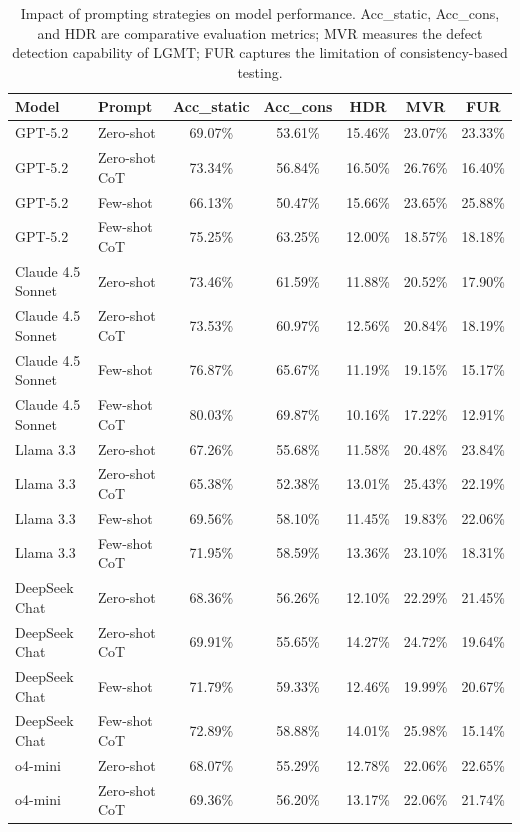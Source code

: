 \begin{table}[pos=htbp]
\centering
\caption{Impact of prompting strategies on model performance. Acc\_static, Acc\_cons, and HDR are comparative evaluation metrics; MVR measures the defect detection capability of LGMT; FUR captures the limitation of consistency-based testing.}\label{tab:rq4}
\begin{tabular}{llccc|c|c}
\toprule
Model & Prompt & Acc\_static & Acc\_cons & HDR & MVR & FUR \\
\midrule
GPT-5.2 & Zero-shot & 69.07\% & 53.61\% & 15.46\% & 23.07\% & 23.33\% \\
GPT-5.2 & Zero-shot CoT & 73.34\% & 56.84\% & 16.50\% & 26.76\% & 16.40\% \\
GPT-5.2 & Few-shot & 66.13\% & 50.47\% & 15.66\% & 23.65\% & 25.88\% \\
GPT-5.2 & Few-shot CoT & 75.25\% & 63.25\% & 12.00\% & 18.57\% & 18.18\% \\
\midrule
Claude 4.5 Sonnet & Zero-shot & 73.46\% & 61.59\% & 11.88\% & 20.52\% & 17.90\% \\
Claude 4.5 Sonnet & Zero-shot CoT & 73.53\% & 60.97\% & 12.56\% & 20.84\% & 18.19\% \\
Claude 4.5 Sonnet & Few-shot & 76.87\% & 65.67\% & 11.19\% & 19.15\% & 15.17\% \\
Claude 4.5 Sonnet & Few-shot CoT & 80.03\% & 69.87\% & 10.16\% & 17.22\% & 12.91\% \\
\midrule
Llama 3.3 & Zero-shot & 67.26\% & 55.68\% & 11.58\% & 20.48\% & 23.84\% \\
Llama 3.3 & Zero-shot CoT & 65.38\% & 52.38\% & 13.01\% & 25.43\% & 22.19\% \\
Llama 3.3 & Few-shot & 69.56\% & 58.10\% & 11.45\% & 19.83\% & 22.06\% \\
Llama 3.3 & Few-shot CoT & 71.95\% & 58.59\% & 13.36\% & 23.10\% & 18.31\% \\
\midrule
DeepSeek Chat & Zero-shot & 68.36\% & 56.26\% & 12.10\% & 22.29\% & 21.45\% \\
DeepSeek Chat & Zero-shot CoT & 69.91\% & 55.65\% & 14.27\% & 24.72\% & 19.64\% \\
DeepSeek Chat & Few-shot & 71.79\% & 59.33\% & 12.46\% & 19.99\% & 20.67\% \\
DeepSeek Chat & Few-shot CoT & 72.89\% & 58.88\% & 14.01\% & 25.98\% & 15.14\% \\
\midrule
o4-mini & Zero-shot & 68.07\% & 55.29\% & 12.78\% & 22.06\% & 22.65\% \\
o4-mini & Zero-shot CoT & 69.36\% & 56.20\% & 13.17\% & 22.06\% & 21.74\% \\

\end{tabular}
\end{table}
